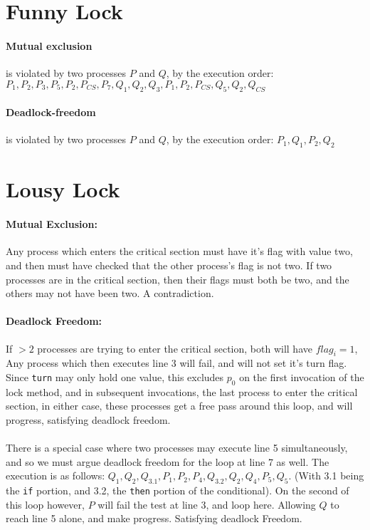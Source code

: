 \documentclass[11pt]{article}
\begin{document}
\maketitle


\section{Funny Lock}
\paragraph{Mutual exclusion}is violated by two processes $P$ and $Q$, by the execution order: $P_1, P_2, P_3, P_5, P_2, P_{CS}, P_7, Q_1, Q_2, Q_3, P_1, P_2, P_{CS}, Q_5, Q_2, Q_{CS}$
\paragraph{Deadlock-freedom}is violated by two processes $P$ and $Q$, by the execution order: $P_1, Q_1, P_2, Q_2$

\section{Lousy Lock}
\paragraph{Mutual Exclusion:} Any process which enters the critical section must have it's flag with value two, and then must have checked that the other process's flag is not two. If two processes are in the critical section, then their flags must both be two, and the others may not have been two. A contradiction.
\paragraph{Deadlock Freedom:} If $>2$ processes are trying to enter the critical section, both will have $flag_i = 1$, Any process which then executes line 3 will fail, and will not set it's turn flag. Since \texttt{turn} may only hold one value, this excludes $p_0$ on the first invocation of the lock method, and in subsequent invocations, the last process to enter the critical section, in either case, these processes get a free pass around this loop, and will progress, satisfying deadlock freedom.
\paragraph{} There is a special case where two processes may execute line 5 simultaneously, and so we must argue deadlock freedom for the loop at line 7 as well. The execution is as follows:  $Q_1, Q_2, Q_{3.1}, P_1, P_2, P_4, Q_{3.2}, Q_2, Q_4, P_5, Q_5$. (With 3.1 being the \texttt{if} portion, and 3.2, the \texttt{then} portion of the conditional). On the second of this loop however, $P$ will fail the test at line 3, and loop here. Allowing $Q$ to reach line 5 alone, and make progress. Satisfying deadlock Freedom.
\end{document}
